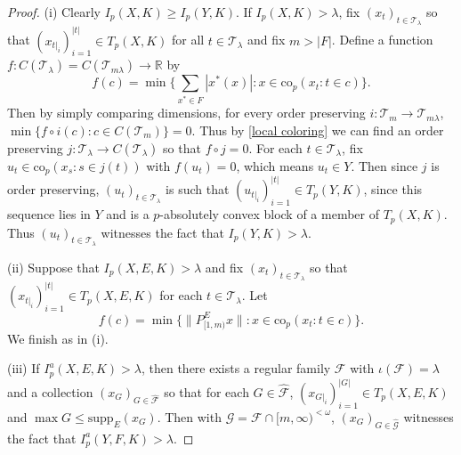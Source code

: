 \documentclass[12pt]{amsart}
\theoremstyle{definition}
\newcommand{\rr}{\mathbb{R}}
\newcommand{\fff}{\mathcal{F}}
\newcommand{\gggg}{\mathcal{G}}
\newcommand{\ttt}{\mathcal{T}}
\newcommand{\supp}{\mathrm{supp}}
\begin{document}
\begin{proof}(i) Clearly $I_p(X, K)\geqslant I_p(Y, K)$.  If $I_p(X, K)>\lambda$, fix $(x_t)_{t\in \ttt_\lambda}$ so that $(x_{t|_i})_{i=1}^{|t|}\in T_p(X,K)$ for all $t\in \ttt_\lambda$ and fix $m>|F|$.  Define a function $f:C(\ttt_\lambda)=C(\ttt_{m\lambda})\to \rr$ by $$f(c)=\min \{\sum_{x^*\in F}|x^*(x)|: x\in \text{co}_p(x_t:t\in c)\}.$$  Then by simply comparing dimensions, for every order preserving $i:\ttt_m\to \ttt_{m\lambda}$, $\min \{f\circ i(c):c\in C(\ttt_m)\}=0$.  Thus by \ref{local coloring} we can find an order preserving $j:\ttt_\lambda\to C(\ttt_\lambda)$ so that $f\circ j=0$.  For each $t\in \ttt_\lambda$, fix $u_t\in \text{co}_p(x_s:s\in j(t))$ with $f(u_t)=0$, which means $u_t\in Y$.  Then since $j$ is order preserving, $(u_t)_{t\in \ttt_\lambda}$ is such that $(u_{t|_i})_{i=1}^{|t|}\in T_p(Y, K)$, since this sequence lies in $Y$ and is a $p$-absolutely convex block of a member of $T_p(X,K)$.  Thus $(u_t)_{t\in \ttt_\lambda}$ witnesses the fact that $I_p(Y,K)>\lambda$.  

(ii) Suppose that $I_p(X,E,K)>\lambda$ and fix $(x_t)_{t\in \ttt_\lambda}$ so that $(x_{t|_i})_{i=1}^{|t|}\in T_p(X,E,K)$ for each $t\in \ttt_\lambda$.  Let $$f(c)= \min\{\|P^E_{[1,m)}x\|: x\in \text{co}_p(x_t:t\in c)\}.$$  We finish as in (i).   

(iii) If $I^a_p(X, E, K)>\lambda$, then there exists a regular family $\fff$ with $\iota(\fff)=\lambda$ and a collection $(x_G)_{G\in \widehat{\fff}}$ so that for each $G\in \widehat{\fff}$, $(x_{G|_i})_{i=1}^{|G|}\in T_p(X, E, K)$ and $\max G\leqslant \supp_E(x_G)$.  Then with $\gggg=\fff\cap [m, \infty)^{<\omega}$, $(x_G)_{G\in \widehat{\gggg}}$ witnesses the fact that $I^a_p(Y, F, K)>\lambda$.  



\end{proof}
\end{document}
